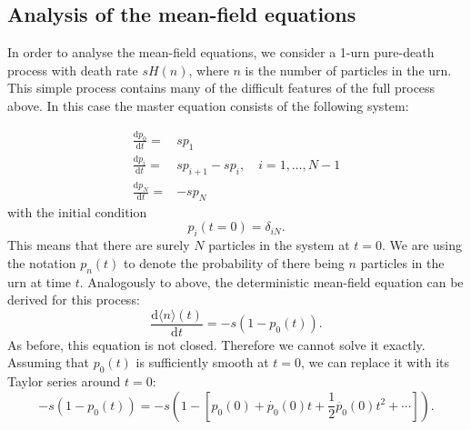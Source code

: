 \documentclass[a4paper,11pt]{report}
\numberwithin{equation}{section}
\newcommand{\diff}[2]{\frac{\mathrm{d} #1}{\mathrm{d} #2}}
\newcommand{\E}[1]{\langle #1 \rangle}
\begin{document}
\FloatBarrier
\subsection{Analysis of the mean-field equations}
In order to analyse the mean-field equations, we consider a 1-urn pure-death
process with death rate \(s H(n)\), where \(n\) is the number of particles in
the urn. This simple process contains many of the difficult features of the full
process above. In this case the master equation consists of the following system:

\begin{align*}
    \diff{p_0}{t} =& s p_1\\
    \diff{p_i}{t} =& s p_{i+1} - s p_i, \quad i = 1,\dotsc,N-1\\
    \diff{p_N}{t} =& - s p_N
\end{align*}
with the initial condition
\begin{equation}
    \label{eqn:pure_death_ic}
    p_i(t=0) = \delta_{iN}.
\end{equation}
This means that there are surely \(N\) particles in the system at \(t=0\). We
are using the notation \(p_n(t)\) to denote the probability of there being \(n\)
particles in the urn at time \(t\).  Analogously to above, the deterministic
mean-field equation can be derived for this process:
\begin{equation*}
    \diff{\E{n}(t)}{t} = -s \left(1-p_0(t)\right).
\end{equation*}
As before, this equation is not closed. Therefore we cannot solve it exactly.
Assuming that \(p_0(t)\) is sufficiently smooth at \(t=0\), we can replace it
with its Taylor series around \(t=0\):
\begin{equation*}
    -s(1-p_0(t)) = -s\left(1 - \left[p_0(0) + \dot{p_0}(0)t +
    \frac{1}{2}\ddot{p_0}(0)t^2 + \dotsb \right] \right).
\end{equation*}
\end{document}
